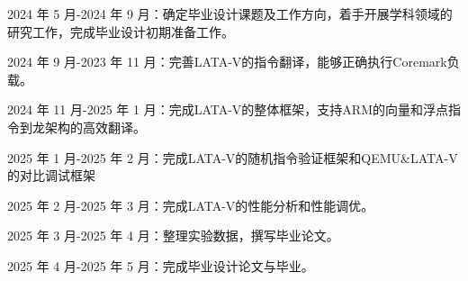 2024  年 5  月-2024  年 9  月：确定毕业设计课题及工作方向，着手开展学科领域的研究工作，完成毕业设计初期准备工作。

2024  年 9  月-2023  年 11  月：完善LATA-V的指令翻译，能够正确执行Coremark负载。

2024  年 11  月-2025  年 1  月：完成LATA-V的整体框架，支持ARM的向量和浮点指令到龙架构的高效翻译。

2025  年 1  月-2025  年 2  月：完成LATA-V的随机指令验证框架和QEMU{\&}LATA-V的对比调试框架

2025  年 2  月-2025  年 3  月：完成LATA-V的性能分析和性能调优。

2025  年 3  月-2025  年 4  月：整理实验数据，撰写毕业论文。

2025  年 4  月-2025  年 5  月：完成毕业设计论文与毕业。

\nocite{*}%
